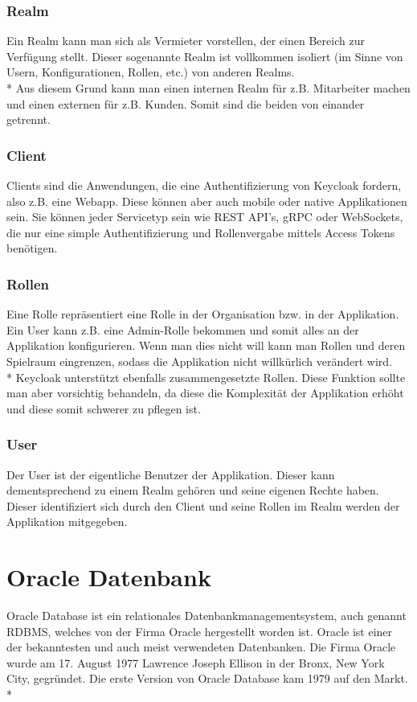 \subsubsection{Realm}
Ein Realm kann man sich als Vermieter vorstellen, der einen Bereich zur Verfügung stellt. Dieser sogenannte Realm ist vollkommen isoliert (im Sinne von Usern, Konfigurationen, Rollen, etc.)
von anderen Realms. \\* Aus diesem Grund kann man einen internen Realm für z.B. Mitarbeiter machen und einen externen für z.B. Kunden. Somit sind die beiden von einander getrennt. \cite{KeyCloakCodex}

\subsubsection{Client}
Clients sind die Anwendungen, die eine Authentifizierung von Keycloak fordern, also z.B. eine Webapp. Diese können aber auch mobile oder native Applikationen sein.
Sie können jeder Servicetyp sein wie REST API's, gRPC oder WebSockets, die nur eine simple Authentifizierung und Rollenvergabe mittels Access Tokens benötigen. \cite{KeyCloakCodex}

\subsubsection{Rollen}
Eine Rolle repräsentiert eine Rolle in der Organisation bzw. in der Applikation. Ein User kann z.B. eine Admin-Rolle bekommen und somit alles an der Applikation konfigurieren.
Wenn man dies nicht will kann man Rollen und deren Spielraum eingrenzen, sodass die Applikation nicht willkürlich verändert wird. \\*
Keycloak unterstützt ebenfalls zusammengesetzte Rollen. Diese Funktion sollte man aber vorsichtig behandeln, da diese die Komplexität der Applikation erhöht und diese somit schwerer zu pflegen ist. \cite{KeyCloakCodex}

\subsubsection{User}
Der User ist der eigentliche Benutzer der Applikation. Dieser kann dementsprechend zu einem Realm gehören und seine eigenen Rechte haben.
Dieser identifiziert sich durch den Client und seine Rollen im Realm werden der Applikation mitgegeben.


\section{Oracle Datenbank}
\author{David Ignjatovic}
Oracle Database ist ein relationales Datenbankmanagementsystem, auch genannt RDBMS, welches von der Firma Oracle hergestellt worden ist. 
Oracle ist einer der bekanntesten und auch meist verwendeten Datenbanken. Die Firma Oracle wurde am 17. August 1977 Lawrence Joseph Ellison in der Bronx, New York City, gegründet.
Die erste Version von Oracle Database kam 1979 auf den Markt. \cite{OracleDB} \\*


